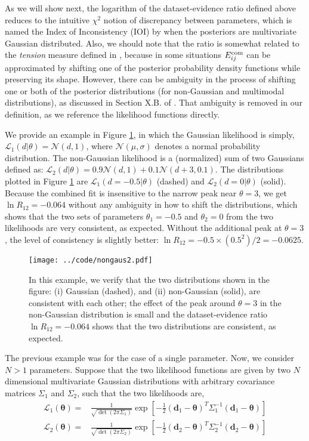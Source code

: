 \documentclass[amsmath, prl, reprint, aps]{revtex4-1}
\newcommand{\donev}{\textbf{d}_1}
\newcommand{\dtwov}{\textbf{d}_2}
\newcommand{\tv}{\bm{\theta}}
\begin{document}
    As we will show next, the logarithm of the {dataset-evidence ratio} defined above reduces to the intuitive $\chi^2$ notion of discrepancy between parameters, which is named the Index of Inconsistency (IOI) by \cite{Lin:2017ikq} when the posteriors are multivariate Gaussian distributed. Also, we should note that the ratio is somewhat related to the \textit{tension} measure defined in \cite{Verde:2013wza}, because in some situations $E_{ij}^{\rm com}$ can be approximated by shifting one of the posterior probability density functions while preserving its shape. However, there can be ambiguity in the process of shifting one or both of the posterior distributions (for non-Gaussian and multimodal distributions), as discussed in Section X.B. of \cite{Lin:2017ikq}. That ambiguity is removed in our definition, as we reference the likelihood functions directly. 
    
    We provide an example in Figure \ref{fig:example1}, in which the Gaussian likelihood is simply, $\mathcal{L}_1(d|\theta) = \mathcal{N}(d, 1)$, where $\mathcal{N}(\mu, \sigma)$ denotes a normal probability distribution. The non-Gaussian likelihood is a (normalized) sum of two Gaussians defined as: $\mathcal{L}_2(d|\theta) = 0.9 \mathcal{N}(d, 1) + 0.1 \mathcal{N}(d+3, 0.1)$. The distributions plotted in Figure \ref{fig:example1} are $\mathcal{L}_1(d=-0.5|\theta)$ (dashed) and $\mathcal{L}_2(d=0|\theta)$ (solid). Because the combined fit is insensitive to the narrow peak near $\theta=3$, we get $\ln R_{12}=-0.064$ without any ambiguity in how to shift the distributions, which shows that the two sets of parameters $\theta_1=-0.5$ and $\theta_2=0$ from the two likelihoods are very consistent, as expected. Without the additional peak at $\theta=3$, the level of consistency is slightly better: $\ln R_{12} = -0.5\times(0.5^2)/2 = -0.0625$.
    
    \begin{figure}
        \centering
        \texttt{[image: ../code/nongaus2.pdf]}
        \caption{In this example, we verify that the two distributions shown in the figure: (i) Gaussian (dashed), and (ii) non-Gaussian (solid), are consistent with each other; the effect of the peak around $\theta=3$ in the non-Gaussian distribution is small and the dataset-evidence ratio $\ln R_{12}=-0.064$ shows that the two distributions are consistent, as expected.}
        \label{fig:example1}
    \end{figure}
    
    The previous example was for the case of a single parameter. Now, we consider $N>1$ parameters. Suppose that the two likelihood functions are given by two $N$ dimensional multivariate Gaussian distributions with arbitrary covariance matrices $\Sigma_1$ and $\Sigma_2$, such that the two likelihoods are,
    \begin{align}
        \mathcal{L}_1(\tv) =& \frac{1}{\sqrt{\det(2\pi \Sigma_1)}} \exp\left[{-\frac{1}{2}}(\donev-\tv)^T \Sigma_1^{-1} (\donev-\tv)\right] \nonumber \\
        \mathcal{L}_2(\tv) =& \frac{1}{\sqrt{\det(2\pi \Sigma_2)}} \exp\left[{-\frac{1}{2}}(\dtwov-\tv)^T \Sigma_2^{-1} (\dtwov-\tv)\right]\nonumber
    \end{align}
    
\end{document}
